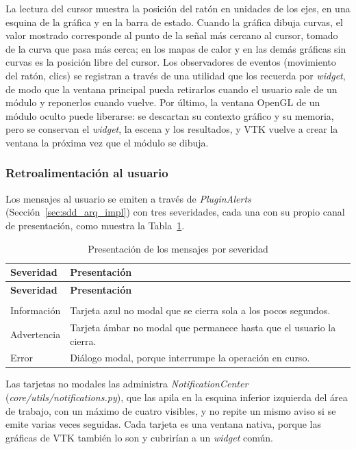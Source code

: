 \documentclass[12pt,letterpaper,oneside]{article}
\DeclareRobustCommand{\_}{\textunderscore\allowbreak}
\begin{document}
La lectura del cursor muestra la posición del ratón en unidades de los ejes, en una esquina de la gráfica y en la barra de estado. Cuando la gráfica dibuja curvas, el valor mostrado corresponde al punto de la señal más cercano al cursor, tomado de la curva que pasa más cerca; en los mapas de calor y en las demás gráficas sin curvas es la posición libre del cursor. Los observadores de eventos (movimiento del ratón, clics) se registran a través de una utilidad que los recuerda por \textit{widget}, de modo que la ventana principal pueda retirarlos cuando el usuario sale de un módulo y reponerlos cuando vuelve. Por último, la ventana OpenGL de un módulo oculto puede liberarse: se descartan su contexto gráfico y su memoria, pero se conservan el \textit{widget}, la escena y los resultados, y VTK vuelve a crear la ventana la próxima vez que el módulo se dibuja.

\subsubsection{Retroalimentación al usuario}
\label{sec:sdd_retro}

Los mensajes al usuario se emiten a través de \textit{PluginAlerts} (Sección~\ref{sec:sdd_arq_impl}) con tres severidades, cada una con su propio canal de presentación, como muestra la Tabla~\ref{tab:sdd_retro}.

\begin{center}
\small
\begin{longtable}{|p{}|p{}|}
\hline
\textbf{Severidad} & \textbf{Presentación} \\
\hline
\endfirsthead
\hline
\textbf{Severidad} & \textbf{Presentación} \\
\hline
\endhead
\hline
\endfoot
\hline
\caption{Presentación de los mensajes por severidad} \label{tab:sdd_retro} \\
\endlastfoot
Información & Tarjeta azul no modal que se cierra sola a los pocos segundos. \\
\hline
Advertencia & Tarjeta ámbar no modal que permanece hasta que el usuario la cierra. \\
\hline
Error & Diálogo modal, porque interrumpe la operación en curso. \\
\hline
\end{longtable}
\end{center}

Las tarjetas no modales las administra \textit{NotificationCenter} (\textit{core/\allowbreak utils/\allowbreak notifications.py}), que las apila en la esquina inferior izquierda del área de trabajo, con un máximo de cuatro visibles, y no repite un mismo aviso si se emite varias veces seguidas. Cada tarjeta es una ventana nativa, porque las gráficas de VTK también lo son y cubrirían a un \textit{widget} común.
\end{document}
